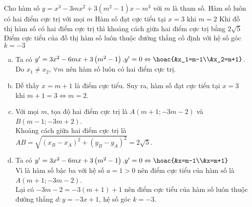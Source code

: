 \begin{ex}
	Cho hàm số $y=x^3-3mx^2+3\left(m^2-1\right)x-m^3$ với $m$ là tham số.
	\choiceTF
	{\True Hàm số luôn có hai điểm cực trị với mọi $m$}
	{\True Hàm số đạt cực tiểu tại $x=3$ khi $m=2$}
	{\True Khi đồ thị hàm số có hai điểm cực trị thì khoảng cách giữa hai điểm cực trị bằng $2\sqrt{5}$}
	{\True Điểm cực tiểu của đồ thị hàm số luôn thuộc đường thẳng cố định với hệ số góc $k=-3$}
	\loigiai
	{
		\begin{enumerate}[a)]
			\item Ta có $y'=3x^2-6mx+3\left(m^2-1\right). y'=0\Leftrightarrow \hoac{&x_1=m-1\\&x_2=m+1}$.\\
			Do $x_1 \ne x_2, \,\forall m$ nên hàm số luôn có hai điểm cực trị.
			\item Dễ thấy $x=m+1$ là điểm cực tiểu. Suy ra, hàm số đạt cực tiểu tại $x=3$ khi $m+1=3 \Leftrightarrow m=2$.
			\item Với mọi $m$, tọa độ hai điểm cực trị là $A(m+1;-3m-2)$ và $B(m-1;-3m+2)$.\\
			Khoảng cách giữa hai điểm cực trị là $AB=\sqrt{(x_B-x_A)^2+(y_B-y_A)^2}=2\sqrt{5}$.
			\item Ta có $y'=3x^2-6mx+3\left(m^2-1\right). y'=0\Leftrightarrow \hoac{&x=m-1\\&x=m+1}$\\
			Vì là hàm số bậc ba với hệ số $a=1>0$ nên điểm cực tiểu của hàm số là $A\left(m+1;-3m-2\right)$. \\
			Lại có $-3m-2=-3\left(m+1\right)+1$ nên điểm cực tiểu của hàm số luôn thuộc đường thẳng $d:y=-3x+1$, hệ số góc $k=-3$.
		\end{enumerate}
	}
\end{ex} 

